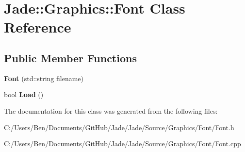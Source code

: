 \hypertarget{class_jade_1_1_graphics_1_1_font}{}\section{Jade\+:\+:Graphics\+:\+:Font Class Reference}
\label{class_jade_1_1_graphics_1_1_font}
\subsection*{Public Member Functions}
\begin{DoxyCompactItemize}
\item 
\hypertarget{class_jade_1_1_graphics_1_1_font_a74d474ba1237cad9f3a7127e84dcf13b}{}{\bfseries Font} (std\+::string filename)\label{class_jade_1_1_graphics_1_1_font_a74d474ba1237cad9f3a7127e84dcf13b}

\item 
\hypertarget{class_jade_1_1_graphics_1_1_font_a321193a4a9244e568bdaf344d65785c4}{}bool {\bfseries Load} ()\label{class_jade_1_1_graphics_1_1_font_a321193a4a9244e568bdaf344d65785c4}

\end{DoxyCompactItemize}


The documentation for this class was generated from the following files\+:\begin{DoxyCompactItemize}
\item 
C\+:/\+Users/\+Ben/\+Documents/\+Git\+Hub/\+Jade/\+Jade/\+Source/\+Graphics/\+Font/Font.\+h\item 
C\+:/\+Users/\+Ben/\+Documents/\+Git\+Hub/\+Jade/\+Jade/\+Source/\+Graphics/\+Font/Font.\+cpp\end{DoxyCompactItemize}
